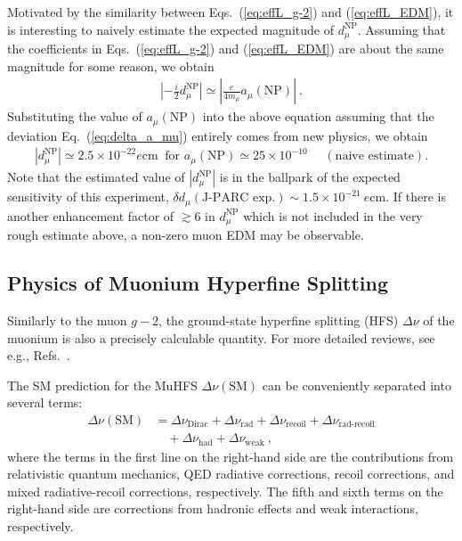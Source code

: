 Motivated by the similarity between Eqs.~(\ref{eq:effL_g-2}) 
and (\ref{eq:effL_EDM}), it is interesting to naively
estimate the expected magnitude of $d_\mu^{\text{NP}}$.
Assuming that the coefficients in Eqs.~(\ref{eq:effL_g-2}) 
and (\ref{eq:effL_EDM}) are about the same magnitude for
some reason, we obtain
%
\begin{align}
  \left| - \frac{i}{2} d_\mu^{\text{NP}} \right| \simeq 
   \left| \frac{e}{4m_\mu} a_\mu(\text{NP}) \right|~.
\end{align}
%
Substituting the value of $a_\mu(\text{NP})$ into the above
equation assuming that the deviation Eq.~(\ref{eq:delta_a_mu})
entirely comes from new physics, we obtain
%
\begin{align}
 |d_\mu^{\text{NP}}| \simeq 2.5 \times 10^{-22} e {\text{cm}}~
\text{ for } 
 a_\mu({\text{NP}}) \simeq 25 \times 10^{-10} 
~~~~~~(\text{naive estimate}).
\end{align}
%
Note that the estimated value of $|d_\mu^{\text{NP}}|$ is
in the ballpark of the expected sensitivity of this experiment,
$\delta d_\mu(\text{J-PARC exp.}) \sim 1.5 \times 
10^{-21} ~ e {\text{cm}}$.  If there is another enhancement
factor of $\gtrsim 6$ in $d_\mu^{\text{NP}}$ which
is not included in the very rough estimate above,
a non-zero muon EDM may be observable.

\subsection{Physics of Muonium Hyperfine Splitting}

Similarly to the muon $g-2$, the ground-state hyperfine
splitting (HFS) $\Delta \nu$ of the muonium is also a precisely
calculable quantity.  For more detailed reviews, see
e.g., Refs.~\cite{CODATA, Eides:1012805}.  

The SM prediction for the MuHFS $\Delta\nu(\text{SM})$
can be conveniently separated into several terms:
%
\begin{align}
 \Delta \nu (\text{SM}) &= 
   \Delta \nu_{\text{Dirac}}  + \Delta \nu_{\text{rad}}
 + \Delta \nu_{\text{recoil}} + \Delta \nu_{\text{rad-recoil}} 
   \nonumber\\
 & \quad
 + \Delta \nu_{\text{had}}    + \Delta \nu_{\text{weak}}~,
\end{align}
%
where the terms in the first line on the right-hand side
are the contributions from relativistic quantum mechanics,
QED radiative corrections, recoil corrections, and
mixed radiative-recoil corrections, respectively.
The fifth and sixth terms on the right-hand side are
corrections from hadronic effects and weak interactions,
respectively.  

